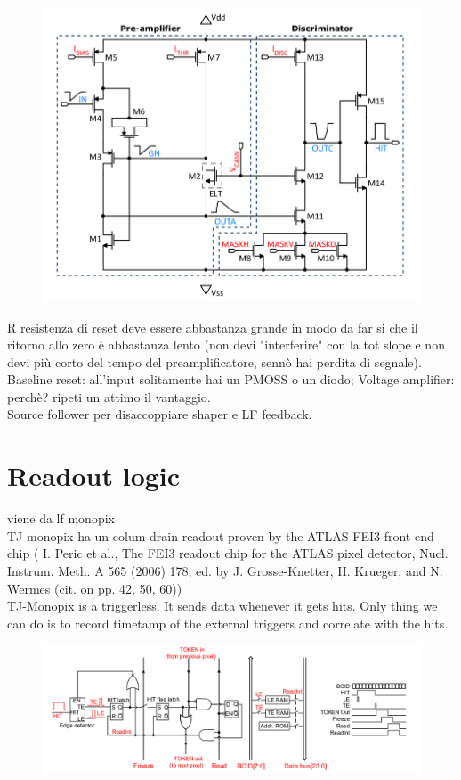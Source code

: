     \begin{figure}[h!]
        \centering
        \includegraphics[width=.7\linewidth]{figures/Monopix1/Monopix1_FE_circuit.png}
        \caption{}
        \label{fig:Monopix1_FE_circuit}
    \end{figure}

        R resistenza di reset deve essere abbastanza grande in modo da far si che il
    ritorno allo zero è abbastanza lento (non devi "interferire" con la tot slope
    e non devi più corto del tempo del preamplificatore, sennò hai perdita di segnale).\\
    Baseline reset: all'input solitamente hai un PMOSS o un diodo;  
    Voltage amplifier: perchè? ripeti un attimo il vantaggio. \\
    Source follower per disaccoppiare shaper e LF feedback.\\


\section{Readout logic}
    viene da lf monopix\\
    TJ monopix ha un colum drain readout proven by the ATLAS FEI3 front end chip (
    I. Peric et al., The FEI3 readout chip for the ATLAS pixel detector,
    Nucl. Instrum. Meth. A 565 (2006) 178, ed. by J. Grosse-Knetter, H. Krueger, and N. Wermes
    (cit. on pp. 42, 50, 60))\\

    TJ-Monopix is a triggerless. It sends data whenever it gets hits. Only thing we can do is to record timetamp of the external triggers and correlate with the hits. 
    \begin{figure}[h!]
        \centering
        \includegraphics[width=.7\linewidth]{figures/Monopix1/Monopix1_readout_schematics.png}
        \caption{}
        \label{fig:Monopix1_readout_schematics}
    \end{figure}

